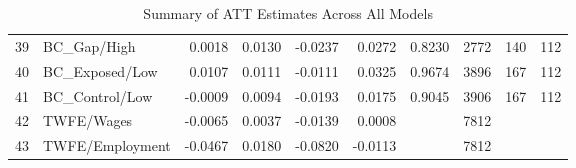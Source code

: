 \begin{table}[ht]
\begin{tabular}{rlrrrrrrrr}
  39 & BC\_Gap/High & 0.0018 & 0.0130 & -0.0237 & 0.0272 & 0.8230 & 2772 & 140 & 112 \\ 
  40 & BC\_Exposed/Low & 0.0107 & 0.0111 & -0.0111 & 0.0325 & 0.9674 & 3896 & 167 & 112 \\ 
  41 & BC\_Control/Low & -0.0009 & 0.0094 & -0.0193 & 0.0175 & 0.9045 & 3906 & 167 & 112 \\ 
  42 & TWFE/Wages & -0.0065 & 0.0037 & -0.0139 & 0.0008 &  & 7812 &  &  \\ 
  43 & TWFE/Employment & -0.0467 & 0.0180 & -0.0820 & -0.0113 &  & 7812 &  &  \\ 
   \hline
\end{tabular}
\caption{Summary of ATT Estimates Across All Models} 
\end{table}
